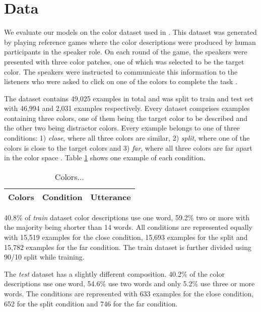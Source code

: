 \section{Data}

We evaluate our models on the color dataset used in \citep{monroe-2017-colors}. This dataset was generated by playing reference games where the color descriptions were produced by human participants in the speaker role. On each round of the game, the speakers were presented with three color patches, one of which was selected to be the target color. The speakers were instructed to communicate this information to the listeners who were asked to click on one of the colors to complete the task \citep{monroe-2017-colors}.

\par
The dataset contains 49,025 examples in total and was split to train and test set with 46,994 and 2,031 examples respectively. Every dataset comprises examples containing three colors, one of them being the target color to be described and the other two being distractor colors. Every example belongs to one of three conditions: 1) \emph{close}, where all three colors are similar, 2) \emph{split}, where one of the colors is close to the target colors and 3) \emph{far}, where all three colors are far apart in the color space \citep{monroe-2017-colors}. Table \ref{table:colors} shows one example of each condition.

\begin{table}[ht]
\centering
\renewcommand{\arraystretch}{1}
\begin{tabular}{|l|l|l|}

  \hline
  Colors & Condition & Utterance \\
  \hline

\end{tabular}
\caption[Colors]{Colors...}
\label{table:colors}
\end{table}

\par
40.8\% of \emph{train} dataset color descriptions use one word, 59.2\% two or more with the majority being shorter than 14 words. All conditions are represented equally with 15,519 examples for the close condition, 15,693 examples for the split and 15,782 examples for the far condition. The train dataset is further divided using 90/10 split while training.

\par
The \emph{test} dataset has a slightly different composition. 40.2\% of the color descriptions use one word, 54.6\% use two words and only 5.2\% use three or more words. The conditions are represented with 633 examples for the close condition, 652 for the split condition and 746 for the far condition.
